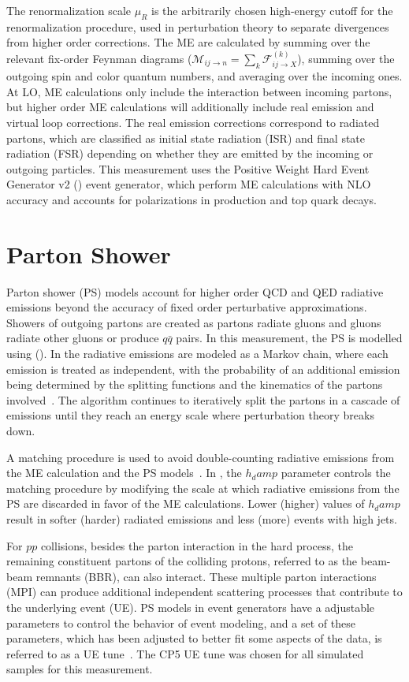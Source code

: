 The renormalization scale $\mu_R$ is the arbitrarily chosen high-energy cutoff for the renormalization procedure, used in perturbation theory to separate divergences from higher order corrections.
The ME are calculated by summing over the relevant fix-order Feynman diagrams ($\mathcal{M}_{i j \rightarrow n}=\sum_k \mathcal{F}_{i j \rightarrow X}^{(k)}$), summing over the outgoing spin and color quantum numbers, and averaging over the incoming ones.
At LO, ME calculations only include the interaction between incoming partons, but higher order ME calculations will additionally include real emission and virtual loop corrections.
The real emission corrections correspond to radiated partons, which are classified as initial state radiation (ISR) and final state radiation (FSR) depending on whether they are emitted by the incoming or outgoing particles.
This measurement uses the Positive Weight Hard Event Generator v2 (\Powheg) event generator, which perform ME calculations with NLO accuracy and accounts for polarizations in \ttbar production and top quark decays.

\section{Parton Shower}
Parton shower (PS) models account for higher order QCD and QED radiative emissions beyond the accuracy of fixed order perturbative approximations.
Showers of outgoing partons are created as partons radiate gluons and gluons radiate other gluons or produce $q\bar{q}$ pairs.
In this measurement, the PS is modelled using (\Pythia).
In \Pythia the radiative emissions are modeled as a Markov chain, where each emission is treated as independent, with the probability of an additional emission being determined by the splitting functions and the kinematics of the partons involved~\cite{pythia8.3}.
The algorithm continues to iteratively split the partons in a cascade of emissions until they reach an energy scale where perturbation theory breaks down.

A matching procedure is used to avoid double-counting radiative emissions from the ME calculation and the PS models~\cite{StefanoFrixione_2007}.
In \Powheg, the $h_damp$ parameter controls the matching procedure by modifying the scale at which radiative emissions from the PS are discarded in favor of the ME calculations.
Lower (higher) values of $h_damp$ result in softer (harder) radiated emissions and less (more) events with high \pT jets.

For $pp$ collisions, besides the parton interaction in the hard process, the remaining constituent partons of the colliding protons, referred to as the beam-beam remnants (BBR), can also interact.
These multiple parton interactions (MPI) can produce additional independent scattering processes that contribute to the underlying event (UE).
PS models in event generators have a adjustable parameters to control the behavior of event modeling, and a set of these parameters, which has been adjusted to better fit some aspects of the data, is referred to as a UE tune~\cite{Sirunyan:2669320}.
The CP5 UE tune was chosen for all simulated samples for this measurement.

